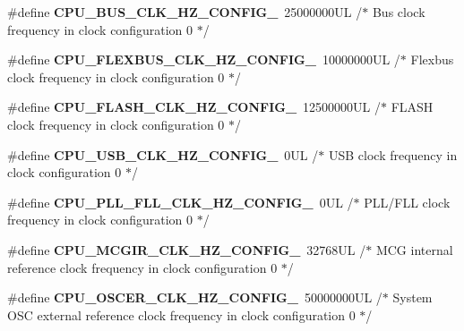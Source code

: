 \begin{DoxyCompactItemize}
\item 
\hypertarget{group___cpu__module_gaf060a047649b9537eb77354ab7917a8b}{}\#define {\bfseries C\+P\+U\+\_\+\+B\+U\+S\+\_\+\+C\+L\+K\+\_\+\+H\+Z\+\_\+\+C\+O\+N\+F\+I\+G\+\_}~25000000\+U\+L /$\ast$ Bus clock frequency in clock configuration 0 $\ast$/\label{group___cpu__module_gaf060a047649b9537eb77354ab7917a8b}

\item 
\hypertarget{group___cpu__module_ga706c0d4dd14c93181b7a99badddc9a51}{}\#define {\bfseries C\+P\+U\+\_\+\+F\+L\+E\+X\+B\+U\+S\+\_\+\+C\+L\+K\+\_\+\+H\+Z\+\_\+\+C\+O\+N\+F\+I\+G\+\_}~10000000\+U\+L /$\ast$ Flexbus clock frequency in clock configuration 0 $\ast$/\label{group___cpu__module_ga706c0d4dd14c93181b7a99badddc9a51}

\item 
\hypertarget{group___cpu__module_ga09c9820f38d931a0400b832d2582c6f7}{}\#define {\bfseries C\+P\+U\+\_\+\+F\+L\+A\+S\+H\+\_\+\+C\+L\+K\+\_\+\+H\+Z\+\_\+\+C\+O\+N\+F\+I\+G\+\_}~12500000\+U\+L /$\ast$ F\+L\+A\+S\+H clock frequency in clock configuration 0 $\ast$/\label{group___cpu__module_ga09c9820f38d931a0400b832d2582c6f7}

\item 
\hypertarget{group___cpu__module_ga7bf843fdf59af5fcaf48bea898884a3e}{}\#define {\bfseries C\+P\+U\+\_\+\+U\+S\+B\+\_\+\+C\+L\+K\+\_\+\+H\+Z\+\_\+\+C\+O\+N\+F\+I\+G\+\_}~0\+U\+L /$\ast$ U\+S\+B clock frequency in clock configuration 0 $\ast$/\label{group___cpu__module_ga7bf843fdf59af5fcaf48bea898884a3e}

\item 
\hypertarget{group___cpu__module_gad2aaa2918b640ae3833fc84e8f983c3c}{}\#define {\bfseries C\+P\+U\+\_\+\+P\+L\+L\+\_\+\+F\+L\+L\+\_\+\+C\+L\+K\+\_\+\+H\+Z\+\_\+\+C\+O\+N\+F\+I\+G\+\_}~0\+U\+L /$\ast$ P\+L\+L/\+F\+L\+L clock frequency in clock configuration 0 $\ast$/\label{group___cpu__module_gad2aaa2918b640ae3833fc84e8f983c3c}

\item 
\hypertarget{group___cpu__module_ga860e7441eac7d5e35385bcd62b019d9d}{}\#define {\bfseries C\+P\+U\+\_\+\+M\+C\+G\+I\+R\+\_\+\+C\+L\+K\+\_\+\+H\+Z\+\_\+\+C\+O\+N\+F\+I\+G\+\_}~32768\+U\+L /$\ast$ M\+C\+G internal reference clock frequency in clock configuration 0 $\ast$/\label{group___cpu__module_ga860e7441eac7d5e35385bcd62b019d9d}

\item 
\hypertarget{group___cpu__module_ga2960ebfe6475f475999ea8f1d5448483}{}\#define {\bfseries C\+P\+U\+\_\+\+O\+S\+C\+E\+R\+\_\+\+C\+L\+K\+\_\+\+H\+Z\+\_\+\+C\+O\+N\+F\+I\+G\+\_}~50000000\+U\+L /$\ast$ System O\+S\+C external reference clock frequency in clock configuration 0 $\ast$/\label{group___cpu__module_ga2960ebfe6475f475999ea8f1d5448483}


\end{DoxyCompactItemize}
